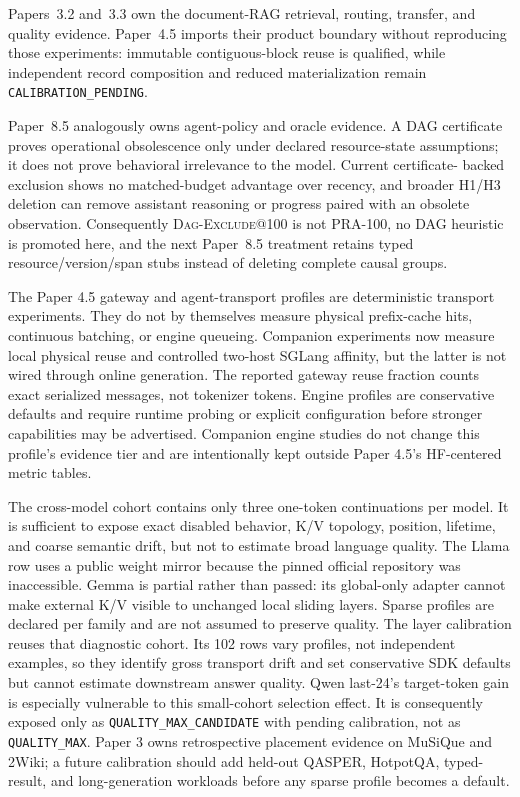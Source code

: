 \documentclass[11pt]{article}
\newcommand{\QualityMaxCandidate}{\texttt{QUALITY\_\allowbreak MAX\_\allowbreak CANDIDATE}}
\newcommand{\QualityMax}{\texttt{QUALITY\_\allowbreak MAX}}
\begin{document}
Papers~3.2 and~3.3 own the document-RAG retrieval, routing, transfer, and quality
evidence. Paper~4.5 imports their product boundary without reproducing those
experiments: immutable contiguous-block reuse is qualified, while independent
record composition and reduced materialization remain
\texttt{CALIBRATION\_PENDING}.

Paper~8.5 analogously owns agent-policy and oracle evidence.  A DAG certificate
proves operational obsolescence only under declared resource-state assumptions;
it does not prove behavioral irrelevance to the model.  Current certificate-
backed exclusion shows no matched-budget advantage over recency, and broader
H1/H3 deletion can remove assistant reasoning or progress paired with an
obsolete observation.  Consequently \textsc{Dag-Exclude}@100 is not PRA-100,
no DAG heuristic is promoted here, and the next Paper~8.5 treatment retains
typed resource/version/span stubs instead of deleting complete causal groups.

The Paper 4.5 gateway and agent-transport profiles are deterministic transport
experiments. They do not by themselves measure physical prefix-cache hits,
continuous batching, or engine queueing. Companion experiments now measure
local physical reuse and controlled two-host SGLang affinity, but the latter is
not wired through online generation. The reported gateway reuse
fraction counts exact serialized messages, not tokenizer tokens. Engine
profiles are conservative defaults and require runtime probing or explicit
configuration before stronger capabilities may be advertised. Companion
engine studies do not change this profile's evidence tier and are intentionally
kept outside Paper 4.5's HF-centered metric tables.

The cross-model cohort contains only three one-token continuations per model.
It is sufficient to expose exact disabled behavior, K/V topology, position,
lifetime, and coarse semantic drift, but not to estimate broad language quality.
The Llama row uses a public weight mirror because the pinned official repository
was inaccessible. Gemma is partial rather than passed: its global-only adapter
cannot make external K/V visible to unchanged local sliding layers. Sparse
profiles are declared per family and are not assumed to preserve quality.
The layer calibration reuses that diagnostic cohort. Its 102 rows vary
profiles, not independent examples, so they identify gross transport drift and
set conservative SDK defaults but cannot estimate downstream answer quality.
Qwen last-24's target-token gain is especially vulnerable to this small-cohort
selection effect. It is consequently exposed only as
\QualityMaxCandidate{} with pending calibration, not as
\QualityMax. Paper 3 owns retrospective placement evidence on MuSiQue and
2Wiki; a future calibration should add held-out QASPER, HotpotQA, typed-result,
and long-generation workloads before any sparse profile becomes a default.
\end{document}
